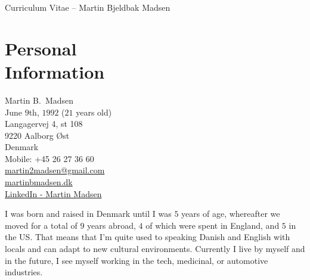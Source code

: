 \documentclass[margin,line,a4paper]{resume}
\begin{document}
\raggedright
{\sc \Large Curriculum Vitae -- Martin Bjeldbak Madsen}
\begin{resume}
    \vspace{0.5cm}
    \begin{figure}
         \vspace{-1cm}
        \begin{center}
        \end{center}
         \vspace{-2cm}
    \end{figure}

    \section{\mysidestyle Personal\\Information}%
    Martin B.\ Madsen\\
    June $9$th, $1992$ ($21$ years old)\\ 
    Langagervej 4, st 108\\
    9220 Aalborg Øst\\
    Denmark\\
    Mobile: +45 26 27 36 60\\
    \href{mailto:martin2madsen@gmail.com}{martin2madsen@gmail.com}\\
    \href{http://www.martinbmadsen.dk}{martinbmadsen.dk}\\
    \href{http://dk.linkedin.com/pub/martin-madsen/21/9b0/b0}{LinkedIn - Martin Madsen}
    \vspace{1cm}

    I was born and raised in Denmark until I was $5$ years of age,
    whereafter we moved for a total of $9$ years abroad, $4$ of which
    were spent in England, and $5$ in the US. That means that I'm quite
    used to speaking Danish and English with locals and can adapt to
    new cultural environments. Currently I live by myself and in the
    future, I see myself working in the tech, medicinal, or automotive
    industries.


\end{resume}
\end{document}
